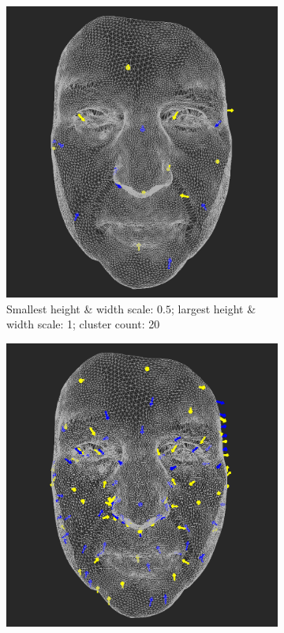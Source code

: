 \begin{figure}[h]
    \begin{subfigure}{0.3\textwidth}
	\includegraphics[width=\textwidth]{./img/meshdiff-arrows-interval0_5-1-count20-single.png}
    \caption{Smallest height \& width scale: \(0.5\); largest height \& width scale: 1; cluster count: 20}
    \label{fig:meshdiff_arrows_1-20}
	\end{subfigure}
    \qquad
    \begin{subfigure}{0.3\textwidth}
	\includegraphics[width=\textwidth]{./img/meshdiff-arrows-interval0_5-1-count125-single.png}

\end{subfigure}
\end{figure}
